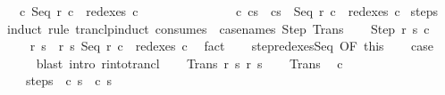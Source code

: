 \begin{isabellebody}
\ \ \ {\isachardoublequoteopen}{\isasymAnd}c{\isachardot}\ Seq\ r\ c\ {\isasymin}\ redexes\ c\ \isanewline
\ \ \ \ \ \ \ \ \ \ \ \ \ {\isasymLongrightarrow}\ {\isasymexists}c{\isacharprime}{\isachardot}\ {\isasymGamma}{\isasymturnstile}{\isacharparenleft}c{\isacharcomma}s{\isacharparenright}\ {\isasymrightarrow}\isactrlsup {\isacharplus}\ {\isacharparenleft}c{\isacharprime}{\isacharcomma}s{\isacharprime}{\isacharparenright}\ {\isasymand}\ Seq\ r{\isacharprime}\ c\ {\isasymin}\ redexes\ c{\isacharprime}{\isachardoublequoteclose}\isanewline
%
\isadelimproof
%
\endisadelimproof
%
\isatagproof
{}\isamarkupfalse%
\ steps\ \isanewline
{}\isamarkupfalse%
\ {\isacharparenleft}induct\ rule{\isacharcolon}\ tranclp{\isacharunderscore}induct{}\ {\isacharbrackleft}consumes\ {}{\isacharcomma}\ case{\isacharunderscore}names\ Step\ Trans{\isacharbrackright}{\isacharparenright}\isanewline
\ \ \isamarkupfalse%
\ {\isacharparenleft}Step\ r{\isacharprime}\ s{\isacharprime}\ c{\isacharprime}{\isacharparenright}\ \isanewline
\ \ \isamarkupfalse%
\ {\isachardoublequoteopen}{\isasymGamma}{\isasymturnstile}\ {\isacharparenleft}r{\isacharcomma}\ s{\isacharparenright}\ {\isasymrightarrow}\ {\isacharparenleft}r{\isacharprime}{\isacharcomma}\ s{\isacharprime}{\isacharparenright}{\isachardoublequoteclose}\ {\isachardoublequoteopen}Seq\ r\ c\ {\isasymin}\ redexes\ c{\isacharprime}{\isachardoublequoteclose}\ \isamarkupfalse%
\ fact{\isacharplus}\isanewline
\ \ \isamarkupfalse%
\ step{\isacharunderscore}redexes{\isacharunderscore}Seq\ {\isacharbrackleft}OF\ this{\isacharbrackright}\isanewline
\ \ \isamarkupfalse%
\ {\isacharquery}case\isanewline
\ \ \ \ \isamarkupfalse%
\ {\isacharparenleft}blast\ intro{\isacharcolon}\ r{\isacharunderscore}into{\isacharunderscore}trancl{\isacharparenright}\isanewline
{}\isamarkupfalse%
\isanewline
\ \ \isamarkupfalse%
\ {\isacharparenleft}Trans\ r{\isacharprime}\ s{\isacharprime}\ r{\isacharprime}{\isacharprime}\ s{\isacharprime}{\isacharprime}{\isacharparenright}\isanewline
\ \ \isamarkupfalse%
\ Trans\ \isamarkupfalse%
\ c{\isacharprime}\ \isanewline
\ \ \ \ steps{\isacharcolon}\ {\isachardoublequoteopen}{\isasymGamma}{\isasymturnstile}\ {\isacharparenleft}c{\isacharcomma}\ s{\isacharparenright}\ {\isasymrightarrow}\isactrlsup {\isacharplus}\ {\isacharparenleft}c{\isacharprime}{\isacharcomma}\ s{\isacharprime}{\isacharparenright}{\isachardoublequoteclose}\ \isanewline

\end{isabellebody}
